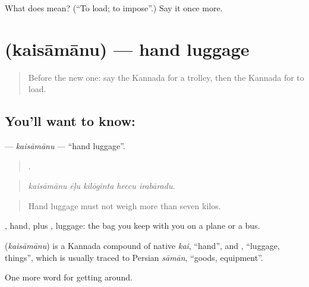 \begin{tcolorbox}[breakable,colback=teal!4,colframe=teal!35!black,title={Before you move on}]
What does  mean? (\textquotedblleft{}To load; to impose\textquotedblright{}.) Say it once more.
\end{tcolorbox}
\section[\texorpdfstring{\kn{ಕೈಸಾಮಾನು} (kaisāmānu)}{ಕೈಸಾಮಾನು (kaisāmānu)}]{ (kaisāmānu) — hand luggage}

\label{lesson:KA-C436-kaisamanu}



\begin{quote}
Before the new one: say the Kannada for a trolley, then the Kannada for to load.
\end{quote}

\subsection*{You'll want to know: }
\textbf{} — \emph{kaisāmānu} — \textquotedblleft{}hand luggage\textquotedblright{}.

\begin{quote}
    .
\end{quote}

\begin{quote}
\emph{kaisāmānu ēḷu kilōginta heccu irabāradu.}
\end{quote}

\begin{quote}
Hand luggage must not weigh more than seven kilos.
\end{quote}

, hand, plus , luggage: the bag you keep with you on a plane or a bus.

\begin{cousinweb}
\textbf{} (\emph{kaisāmānu}) is a Kannada compound of native \emph{kai}, \textquotedblleft{}hand\textquotedblright{}, and , \textquotedblleft{}luggage, things\textquotedblright{}, which is usually traced to Persian \emph{sāmān}, \textquotedblleft{}goods, equipment\textquotedblright{}.
\end{cousinweb}

\begin{grammarlens}[title={What you've built}]
One more word for getting around.
\end{grammarlens}


